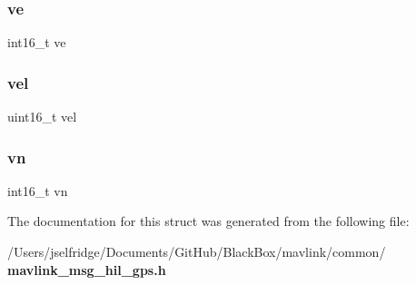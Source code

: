 \mbox{\label{struct____mavlink__hil__gps__t_a4b34f77917eac4f287e3652382cdc64f}} 
\subsubsection{ve}
{\footnotesize\ttfamily int16\+\_\+t ve}

\mbox{\label{struct____mavlink__hil__gps__t_ab6d53e7a88e63467ea349ec7d5423324}} 
\subsubsection{vel}
{\footnotesize\ttfamily uint16\+\_\+t vel}

\mbox{\label{struct____mavlink__hil__gps__t_aa535a2af7ada50d35470f8b85ee94683}} 
\subsubsection{vn}
{\footnotesize\ttfamily int16\+\_\+t vn}



The documentation for this struct was generated from the following file\+:\begin{DoxyCompactItemize}
\item 
/\+Users/jselfridge/\+Documents/\+Git\+Hub/\+Black\+Box/mavlink/common/\textbf{ mavlink\+\_\+msg\+\_\+hil\+\_\+gps.\+h}\end{DoxyCompactItemize}

